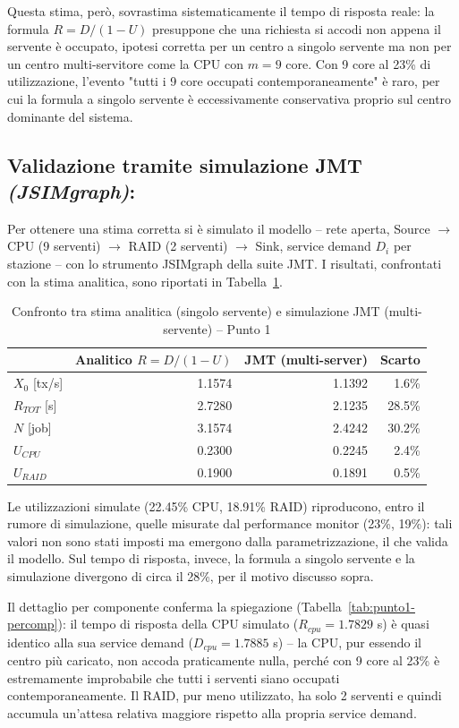 \documentclass[11pt,a4paper]{article}
\begin{document}
Questa stima, però, sovrastima sistematicamente il tempo di risposta reale: la formula
$R=D/(1-U)$ presuppone che una richiesta si accodi non appena il servente è occupato, ipotesi
corretta per un centro a singolo servente ma non per un centro multi-servitore come la CPU con
$m=9$ core. Con 9 core al 23\% di utilizzazione, l'evento "tutti i 9 core occupati contemporaneamente"
è raro, per cui la formula a singolo servente è eccessivamente conservativa proprio sul centro
dominante del sistema.

\subsection{Validazione tramite simulazione JMT \textit{(JSIMgraph)}:}

Per ottenere una stima corretta si è simulato il modello -- rete aperta, Source $\to$ CPU (9
serventi) $\to$ RAID (2 serventi) $\to$ Sink, service demand $D_{i}$ per stazione -- con lo strumento
JSIMgraph della suite JMT. I risultati, confrontati con la stima analitica, sono riportati in
Tabella~\ref{tab:punto1}.

\begin{table}[h]
\centering
\caption{Confronto tra stima analitica (singolo servente) e simulazione JMT (multi-servente) -- Punto 1}
\label{tab:punto1}
\begin{tabular}{lrrr}
\toprule
 & Analitico $R=D/(1-U)$ & JMT (multi-server) & Scarto \\
\midrule
$X_0$ [tx/s] & 1.1574 & 1.1392 & 1.6\% \\
$R_{TOT}$ [s] & 2.7280 & 2.1235 & 28.5\% \\
$N$ [job] & 3.1574 & 2.4242 & 30.2\% \\
$U_{CPU}$ & 0.2300 & 0.2245 & 2.4\% \\
$U_{RAID}$ & 0.1900 & 0.1891 & 0.5\% \\
\bottomrule
\end{tabular}
\end{table}

Le utilizzazioni simulate (22.45\% CPU, 18.91\% RAID) riproducono, entro il rumore di
simulazione, quelle misurate dal performance monitor (23\%, 19\%): tali valori non sono stati
imposti ma emergono dalla parametrizzazione, il che valida il modello. Sul tempo di risposta,
invece, la formula a singolo servente e la simulazione divergono di circa il 28\%, per il motivo
discusso sopra.

Il dettaglio per componente conferma la spiegazione (Tabella~\ref{tab:punto1-percomp}): il tempo
di risposta della CPU simulato ($R_{cpu}=1.7829$ s) è quasi identico alla sua service demand
($D_{cpu}=1.7885$ s) -- la CPU, pur essendo il centro più caricato, non accoda praticamente nulla,
perché con 9 core al 23\% è estremamente improbabile che tutti i serventi siano occupati
contemporaneamente. Il RAID, pur meno utilizzato, ha solo 2 serventi e quindi accumula
un'attesa relativa maggiore rispetto alla propria service demand.
\end{document}
